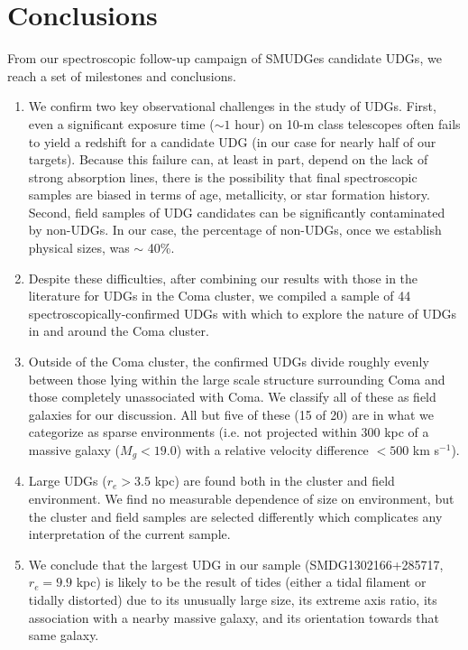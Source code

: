 \documentclass[twocolumn,tighten]{aastex63}
\begin{document}

\section{Conclusions}

From our spectroscopic follow-up campaign of SMUDGes candidate UDGs, we reach a set of milestones and conclusions. 

\begin{enumerate}
    \item We confirm two key observational challenges in the study of UDGs. First, even a significant exposure time ($\sim1$ hour) on 10-m class telescopes often fails to yield a redshift for a candidate UDG (in our case 
    for nearly half of our targets). Because this failure can, at least in part, depend on the lack of strong absorption lines, there is the possibility that final spectroscopic samples are biased in terms of age, metallicity, or star formation history. Second, field samples of UDG candidates can be significantly contaminated by non-UDGs. In our case, the percentage of non-UDGs, once we establish physical sizes, was $\sim$ 40\%. 
    
    \item Despite these difficulties, after combining our results with those in the literature for UDGs in the Coma cluster, we compiled a sample of 44 spectroscopically-confirmed UDGs with which to explore the nature of UDGs in and around the Coma cluster.
    
    \item Outside of the Coma cluster, the confirmed UDGs divide roughly evenly between those lying within the large scale structure surrounding Coma and those completely unassociated with Coma. We classify all of these as field galaxies for our discussion. All but five of these (15 of 20) are in what we categorize as sparse environments (i.e. not projected within 300 kpc of a massive galaxy ($M_g < 19.0$) with a relative velocity difference $<500$ km s$^{-1}$).
   
    \item Large UDGs ($r_e > 3.5$ kpc) are found both in the cluster and field environment. We find no measurable dependence of size on environment, but the cluster and field samples are selected differently which complicates any interpretation of the current sample.
    
    \item We conclude that the largest UDG in our sample (SMDG1302166+285717, $r_e = 9.9$ kpc) is likely to be the result of tides (either a tidal filament or tidally distorted) due to its unusually large size, its extreme axis ratio, its association with a nearby massive galaxy, and its orientation towards that same galaxy.
    

\end{enumerate}
\end{document}
